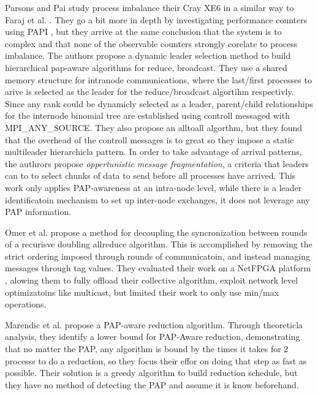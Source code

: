 Parsons and Pai \cite{Parsons2015ExpProcImbMPICollHierarcialSys} study process imbalance their Cray XE6 in a similar way to Faraj et al. \cite{Faraj2008StudyProcArrivalMPIColl}.
They go a bit more in depth by investigating performance counters using PAPI \cite{Mucci1999PAPI}, but they arrive at the same conclusion that the system is to complex and that none of the observable counters strongly corelate to process imbalance. 
The authors propose a dynamic leader selection method to build hierarchical pap-aware algorithms for reduce, broadcast.
They use a shared memory structure for intranode communications, where the last/first processes to arive is selected as the leader for the reduce/broadcast algortihm respectivly. 
Since any rank could be dynamicly selected as a leader, parent/child relationships for the internode binomial tree are established using controll messaged with MPI\_ANY\_SOURCE. 
They also propose an alltoall algorthm, but they found that the overhead of the controll messages is to great so they impose a static multileader hierarchicla pattern.
In order to take advantage of arrival patterns, the authrors propose \textit{oppertunistic message fragmentation}, a criteria that leaders can to to select chunks of data to send before all processes have arrived.
This work only applies PAP-awareness at an intra-node level, while there is a leader identificatoin mechanism to set up inter-node exchanges, it does not leverage any PAP information.

Omer et al. \cite{Arap2015AdaptiveRDForCC} propose a method for decoupling the syncronization between rounds of a recurisve doubling allreduce algorithm. 
This is accomplished by removing the strict ordering imposed through rounds of communicatoin, and instead managing messages through tag values.
They evaluated their work on a NetFPGA platform \cite{Lockwood2007NetFPGA}, alowing them to fully offload their collective algorithm, exploit network level optimizatoins like multicast, but limited their work to only use min/max operations.

Marendic et al. \cite{Marendic2016Clairvoyant} propose a PAP-aware reduction algorithm.
Through theoreticla analysis, they identify a lower bound for PAP-Aware reduction, demonstrating that no matter the PAP, any algorithm is bound by the times it takes for 2 processs to do a reduction, so they focus their effor on doing that step as fast as possible. 
Their solution is a greedy algorithm to build reduction schedule, but they have no method of detecting the PAP and assume it is know beforehand.

